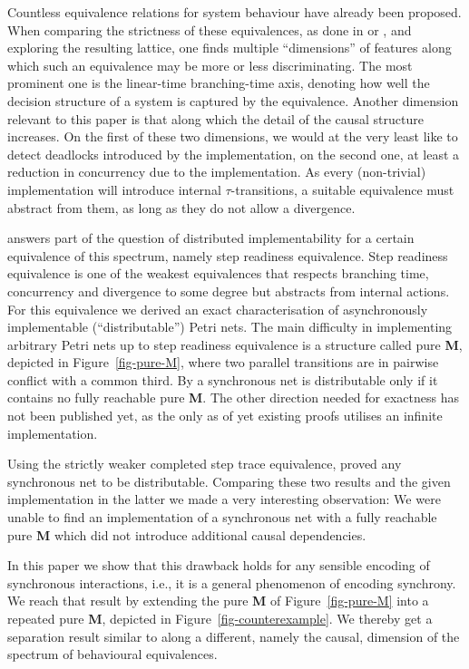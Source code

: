 \documentclass[submission,copyright,creativecommons]{eptcs}
\theoremstyle{definition}
\def\figurename{Figure}
\newcommand{\reffig}[1]{\figurename~\ref{fig-#1}}
\begin{document}
Countless equivalence relations for system behaviour have already been proposed.
When comparing the strictness of these equivalences, as done in
\cite{vanglabbeek93linear} or \cite{vanglabbeek01refinement},
and exploring the resulting lattice,
one finds multiple ``dimensions'' of features along which such an equivalence
may be more or less discriminating.
The most prominent one is the linear-time branching-time axis, denoting how well
the decision structure of a system is captured by the equivalence.
Another dimension relevant to this paper is that along which the detail of
the causal structure increases.
On the first of these two dimensions, we would at the very least like to detect
deadlocks introduced by the implementation, on the second one, at least a
reduction in concurrency due to the implementation.
As every (non-trivial) implementation will introduce internal $\tau$-transitions,
a suitable equivalence must abstract from them, as long as they do not
allow a divergence.

\cite{glabbeek08syncasyncinteraction} answers part of the question of
distributed implementability for a certain equivalence of this spectrum, namely step
readiness equivalence.
Step readiness equivalence is one of the weakest equivalences that
respects branching time, concurrency and divergence
to some degree but
abstracts from internal actions. For this equivalence we derived an
exact characterisation of asynchronously implementable (``distributable'')
Petri nets.
The main difficulty in implementing arbitrary Petri nets up to step readiness
equivalence is a structure called pure \textbf{M}, depicted in \reffig{pure-M},
where two parallel transitions are in pairwise conflict with a common third.
By \cite{glabbeek08syncasyncinteraction} a synchronous net is distributable
only if it contains no fully reachable pure \textbf{M}. The other direction needed
for exactness has not been published yet, as the only as of yet existing proofs
utilises an infinite implementation.

Using the strictly weaker completed step trace equivalence,
\cite{schicke09synchrony} proved any synchronous net to be distributable.
Comparing these two results and the given implementation in the latter we made
a very interesting observation: We were unable to find an implementation of a
synchronous net with a fully reachable pure \textbf{M} which did not introduce
additional causal dependencies.

In this paper we show that this drawback holds for any sensible encoding of
synchronous interactions, i.e., it is a general phenomenon of encoding
synchrony. We reach that result by extending the pure \textbf{M} of \reffig{pure-M}
into a repeated pure \textbf{M}, depicted in \reffig{counterexample}.
We thereby get a separation result similar to
\cite{glabbeek08syncasyncinteraction} along a different, namely the causal,
dimension of the spectrum of behavioural equivalences.
\end{document}
